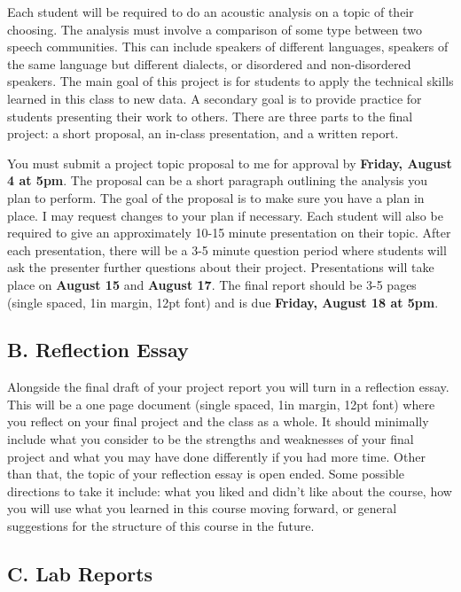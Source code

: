 \documentclass[11pt]{article}
\begin{document}
Each student will be required to do an acoustic analysis on a topic of their choosing. 
The analysis must involve a comparison of some type between two speech communities. 
This can include speakers of different languages, speakers of the same language but different dialects, or disordered and non-disordered speakers.
The main goal of this project is for students to apply the technical skills learned in this class to new data.
A secondary goal is to provide practice for students presenting their work to others.
There are three parts to the final project: a short proposal, an in-class presentation, and a written report.

You must submit a project topic proposal to me for approval by \textbf{Friday, August 4 at 5pm}. 
The proposal can be a short paragraph outlining the analysis you plan to perform. The goal of the proposal is to make sure you have a plan in place. 
I may request changes to your plan if necessary. 
Each student will also be required to give an approximately 10-15 minute presentation on their topic. 
After each presentation, there will be a 3-5 minute question period where students will ask the presenter further questions about their project. 
Presentations will take place on \textbf{August 15} and \textbf{August 17}. 
The final report should be 3-5 pages (single spaced, 1in margin, 12pt font) and is due \textbf{Friday, August 18 at 5pm}.

\subsection*{B. Reflection Essay}

Alongside the final draft of your project report you will turn in a reflection essay. This will be a one page document (single spaced, 1in margin, 12pt font) where you reflect on your final project and the class as a whole. It should minimally include what you consider to be the strengths and weaknesses of your final project and what you may have done differently if you had more time. Other than that, the topic of your reflection essay is open ended. Some possible directions to take it include: what you liked and didn't like about the course, how you will use what you learned in this course moving forward, or general suggestions for the structure of this course in the future.

\subsection*{C. Lab Reports}
\end{document}
